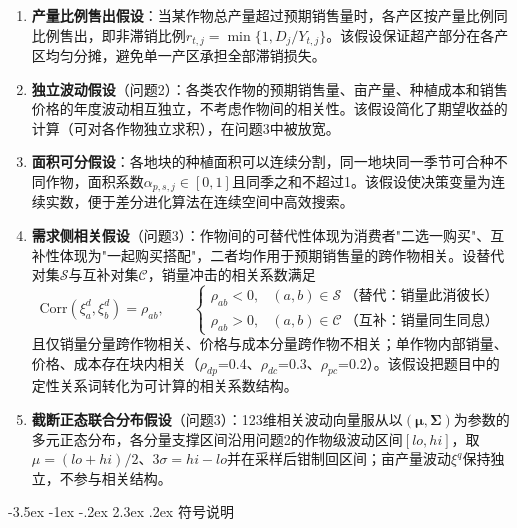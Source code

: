 \documentclass[12pt,a4paper]{article}
\makeatletter
\renewcommand\section{\@startsection{section}{1}{\z@}%
  {-3.5ex \@plus -1ex \@minus -.2ex}%
  {2.3ex \@plus .2ex}%
  {\centering\normalfont\Large\bfseries}}
\makeatother
\begin{document}
\begin{enumerate}
\renewcommand{\labelenumi}{(\arabic{enumi})}
  \item \textbf{产量比例售出假设}：当某作物总产量超过预期销售量时，各产区按产量比例同比例售出，即非滞销比例$r_{t,j}=\min\{1,D_j/Y_{t,j}\}$。该假设保证超产部分在各产区均匀分摊，避免单一产区承担全部滞销损失。
  \item \textbf{独立波动假设}（问题2）：各类农作物的预期销售量、亩产量、种植成本和销售价格的年度波动相互独立，不考虑作物间的相关性。该假设简化了期望收益的计算（可对各作物独立求积），在问题3中被放宽。
  \item \textbf{面积可分假设}：各地块的种植面积可以连续分割，同一地块同一季节可合种不同作物，面积系数$\alpha_{p,s,j}\in[0,1]$且同季之和不超过1。该假设使决策变量为连续实数，便于差分进化算法在连续空间中高效搜索。
  \item \textbf{需求侧相关假设}（问题3）：作物间的可替代性体现为消费者"二选一购买"、互补性体现为"一起购买搭配"，二者均作用于预期销售量的跨作物相关。设替代对集$\mathcal S$与互补对集$\mathcal C$，销量冲击的相关系数满足
\begin{equation}
\mathrm{Corr}(\xi^d_a,\xi^d_b)=\rho_{ab},\qquad
\begin{cases}
\rho_{ab}<0,& (a,b)\in\mathcal S\ \text{（替代：销量此消彼长）}\\
\rho_{ab}>0,& (a,b)\in\mathcal C\ \text{（互补：销量同生同息）}
\end{cases}
\label{eq:assum_sub}
\end{equation}
且仅销量分量跨作物相关、价格与成本分量跨作物不相关；单作物内部销量、价格、成本存在块内相关（$\rho_{dp}$=0.4、$\rho_{dc}$=0.3、$\rho_{pc}$=0.2）。该假设把题目中的定性关系词转化为可计算的相关系数结构。
  \item \textbf{截断正态联合分布假设}（问题3）：123维相关波动向量服从以$(\boldsymbol{\mu},\boldsymbol{\Sigma})$为参数的多元正态分布，各分量支撑区间沿用问题2的作物级波动区间$[lo,hi]$，取$\mu=(lo+hi)/2$、$3\sigma=hi-lo$并在采样后钳制回区间；亩产量波动$\xi^q$保持独立，不参与相关结构。
\end{enumerate}

\section{符号说明}
\end{document}
